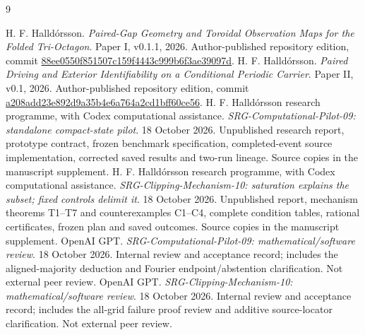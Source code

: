 \begin{thebibliography}{9}
\raggedright
{}
H. F. Halldórsson.
\emph{Paired-Gap Geometry and Toroidal Observation Maps for the Folded Tri-Octagon}.
Paper I, v0.1.1, 2026. Author-published repository edition, commit
\href{https://github.com/pzychozen/trioctagon-physics/commit/88ee0550f851507c159f4443c999b6f3ae39097d}{88ee0550f851507c159f4443c999b6f3ae39097d}.
H. F. Halldórsson.
\emph{Paired Driving and Exterior Identifiability on a Conditional Periodic Carrier}.
Paper II, v0.1, 2026. Author-published repository edition, commit
\href{https://github.com/pzychozen/trioctagon-physics/commit/a208add23e892d9a35b4e6a764a2cd1bff60ce56}{a208add23e892d9a35b4e6a764a2cd1bff60ce56}.
H. F. Halldórsson research programme, with Codex computational assistance.
\emph{SRG-Computational-Pilot-09: standalone compact-state pilot}.
18 October 2026. Unpublished research report, prototype contract, frozen benchmark specification, completed-event source implementation, corrected saved results and two-run lineage. Source copies in the manuscript supplement.
H. F. Halldórsson research programme, with Codex computational assistance.
\emph{SRG-Clipping-Mechanism-10: saturation explains the subset; fixed controls delimit it}.
18 October 2026. Unpublished report, mechanism theorems T1--T7 and counterexamples C1--C4, complete condition tables, rational certificates, frozen plan and saved outcomes. Source copies in the manuscript supplement.
OpenAI GPT.
\emph{SRG-Computational-Pilot-09: mathematical/software review}.
18 October 2026. Internal review and acceptance record; includes the aligned-majority deduction and Fourier endpoint/abstention clarification. Not external peer review.
OpenAI GPT.
\emph{SRG-Clipping-Mechanism-10: mathematical/software review}.
18 October 2026. Internal review and acceptance record; includes the all-grid failure proof review and additive source-locator clarification. Not external peer review.
\end{thebibliography}
